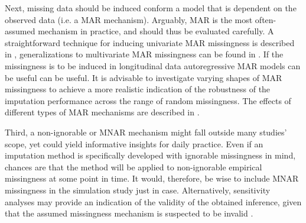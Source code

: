\documentclass[bimj,fleqn]{w-art}
\begin{document}
Next, missing data should be induced conform a model that is dependent on the observed data (i.e. a MAR mechanism). Arguably, MAR is the most often-assumed mechanism in practice, and should thus be evaluated carefully. A straightforward technique for inducing univariate MAR missingness is described in \citet[][\S 3.2.4]{buur18}, generalizations to multivariate MAR missingness can be found in \citet{ampute}. If the missingness is to be induced in longitudinal data autoregressive MAR models can be useful \citep[see e.g.][model 2 and model 3]{shara2015randomly} can be useful. It is advisable to investigate varying shapes of MAR missingness to achieve a more realistic indication of the robustness of the imputation performance across the range of random missingness. The effects of different types of MAR mechanisms are described in \citet{scho18}.%

Third, a non-ignorable or MNAR mechanism might fall outside many studies' scope, yet could yield informative insights for daily practice. Even if an imputation method is specifically developed with ignorable missingness in mind, chances are that the method will be applied to non-ignorable empirical missingness at some point in time. It would, therefore, be wise to include MNAR missingness in the simulation study just in case. Alternatively, sensitivity analyses may provide an indication of the validity of the obtained inference, given that the assumed missingness mechanism is suspected to be invalid \citep[see e.g.][part 5]{molenberghs2014handbook}.
\end{document}
